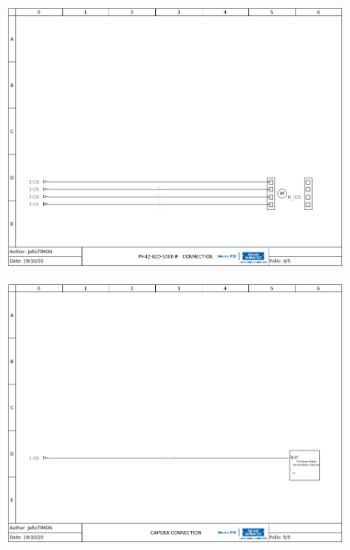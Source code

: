 \documentclass[
12pt,					%
openright,				%
twoside,				%
a4paper,				%
english,
brazil
]{ABNT/abntex2_report}
\begin{document}
	\begin{figure}[H]
		\centering
		\includegraphics[scale=0.72]{appendix/connection_4.png}
		\label{fig:connection4}
	\end{figure}

	\begin{figure}[H]
		\centering
		\includegraphics[scale=0.72]{appendix/connection_5.png}
		\label{fig:connection5}
	\end{figure}

	

	
\end{document}
